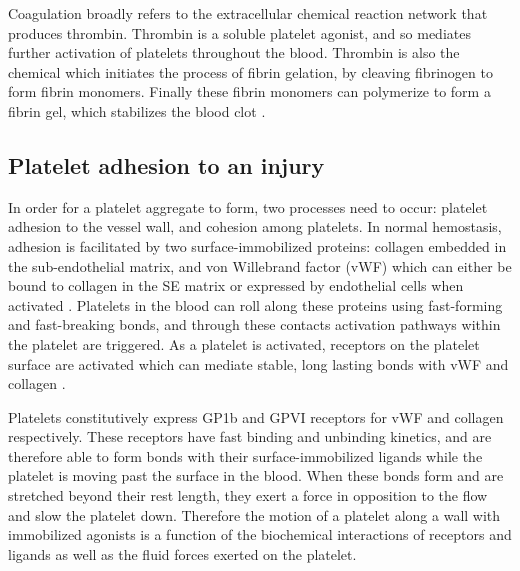 Coagulation broadly refers to the extracellular chemical reaction
network that produces thrombin. Thrombin is a soluble platelet
agonist, and so mediates further activation of platelets throughout
the blood. Thrombin is also the chemical which initiates the process
of fibrin gelation, by cleaving fibrinogen to form fibrin
monomers. Finally these fibrin monomers can polymerize to form a
fibrin gel, which stabilizes the blood clot \cite{Fogelson2015}. 


\subsection{Platelet adhesion to an injury}
\label{sec:platelet-adhesion}

In order for a platelet aggregate to form, two processes need to
occur: platelet adhesion to the vessel wall, and cohesion among
platelets. In normal hemostasis, adhesion is facilitated by two
surface-immobilized proteins: collagen embedded in the sub-endothelial
matrix, and von Willebrand factor (vWF) which can either be bound to
collagen in the SE matrix or expressed by endothelial cells when
activated \cite{Fogelson2015}. Platelets in the blood can roll along
these proteins using fast-forming and fast-breaking bonds, and through
these contacts activation pathways within the platelet are
triggered. As a platelet is activated, receptors on the platelet
surface are activated which can mediate stable, long lasting bonds
with vWF and collagen \cite{Bye2016,Li2010,Fogelson2015,Qiu2015}. 
		
Platelets constitutively express GP1b and GPVI receptors for vWF and
collagen respectively. These receptors have fast binding and unbinding
kinetics, and are therefore able to form bonds with their
surface-immobilized ligands while the platelet is moving past the
surface in the blood. When these bonds form and are stretched beyond
their rest length, they exert a force in opposition to the flow and
slow the platelet down. Therefore the motion of a platelet along a
wall with immobilized agonists is a function of the biochemical
interactions of receptors and ligands as well as the fluid forces
exerted on the platelet.
		
